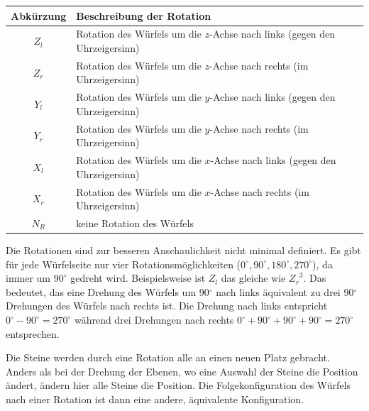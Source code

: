 \documentclass[12pt,a4paper, usenames, dvipsnames]{article}
\theoremstyle{mystyle}
\theoremstyle{definition}
\begin{document}
\vspace*{1em}
\begin{adjustbox}{width=1\textwidth,center}
\begin{tabular}{cl}
\toprule
\textbf{Abkürzung} & \textbf{Beschreibung der Rotation} \\
\midrule
$Z_l$ & Rotation des Würfels um die $z$-Achse nach links (gegen den Uhrzeigersinn)\\

$Z_r$ & Rotation des Würfels um die $z$-Achse nach rechts (im Uhrzeigersinn)  \\

$Y_l$ & Rotation des Würfels um die $y$-Achse nach links (gegen den Uhrzeigersinn)\\

$Y_r$ & Rotation des Würfels um die $y$-Achse nach rechts (im Uhrzeigersinn)  \\

$X_l$ & Rotation des Würfels um die $x$-Achse nach links (gegen den Uhrzeigersinn)\\

$X_r$ & Rotation des Würfels um die $x$-Achse nach rechts (im Uhrzeigersinn) \\

$N_R$ & keine Rotation des Würfels \\
\bottomrule
\end{tabular} 
\end{adjustbox}
\vspace*{0.5em}


Die Rotationen sind zur besseren Anschaulichkeit nicht minimal definiert. Es gibt für jede Würfelseite nur vier Rotationsmöglichkeiten ($0^\circ, 90^\circ, 180^\circ, 270^\circ$), da immer um $90^\circ$ gedreht wird. Beispielsweise ist $Z_l$ das gleiche wie ${Z_r}^3$. Das bedeutet, das eine Drehung des Würfels um 90$^\circ$ nach links äquivalent zu drei 90$^\circ$ Drehungen des Würfels nach rechts ist.  Die Drehung nach links entspricht $0^\circ-90^\circ = 270^\circ$ während drei Drehungen nach rechts $0^\circ+90^\circ+90^\circ+90^\circ=270^\circ$ entsprechen.

Die Steine werden durch eine Rotation alle an einen neuen Platz gebracht. Anders als bei der Drehung der Ebenen, wo eine Auswahl der Steine die Position ändert, ändern hier alle Steine die Position. Die Folgekonfiguration des Würfels nach einer Rotation ist dann eine andere, äquivalente Konfiguration.
\end{document}
